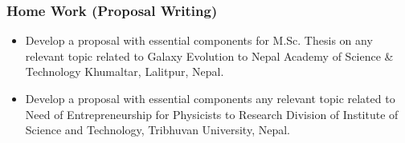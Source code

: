\documentclass{beamer}
\begin{document}
\begin{frame}
\frametitle{\bf Home Work (Proposal Writing)}
\begin{itemize}
\bf
\item \color{blue} Develop a proposal with essential components for M.Sc.
Thesis on any relevant topic related to Galaxy Evolution to
Nepal Academy of Science \& Technology Khumaltar,
Lalitpur, Nepal.\\
\item \color{red}Develop a proposal with essential components any
relevant topic related to Need of Entrepreneurship for
Physicists to Research Division of Institute of Science and
Technology, Tribhuvan University, Nepal.
\end{itemize}
\end{frame}

%

\begin{frame}
\centering
\Huge\bf\color{red}{Thank You Very Much!!!}\\
\vspace{4cm}
\bf\large\color{blue}{[Take Care, Stay Safe \& Stay busy in Research]}
\end{frame}
\end{document}
